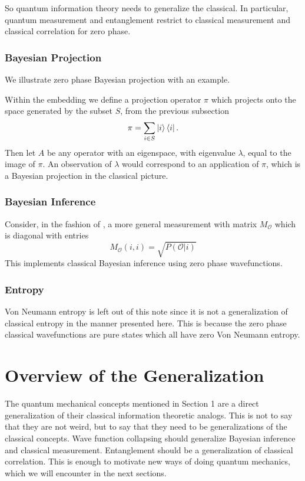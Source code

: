 \documentclass[12pt,a4paper]{article}
\begin{document}
So quantum information theory needs to generalize the classical.  In particular, quantum measurement and entanglement restrict to classical measurement and classical correlation for zero phase.

\subsubsection{Bayesian Projection}
We illustrate zero phase Bayesian projection with an example.

Within the embedding we define a projection operator $\pi$ which projects onto the space generated by the subset $S$, from the previous subsection
\[
\pi = \sum_{i \in S} \ket{i} \bra{i}.
\]
Then let $A$ be any operator with an eigenspace, with eigenvalue $\lambda$, equal to the image of $\pi$.  An observation of $\lambda$ would correspond to an application of $\pi$, which is a Bayesian projection in the classical picture.

\subsubsection{Bayesian Inference}
Consider, in the fashion of \cite{nielsenchuang}, a more general measurement with matrix $M_\mathcal{O}$ which is diagonal with entries
\[
   M_\mathcal{O}(i,i) = \sqrt{P(\mathcal{O} | i)}
\]
This implements classical Bayesian inference using zero phase wavefunctions.


\subsubsection{Entropy}
Von Neumann entropy is left out of this note since it is not a generalization of classical entropy in the manner presented here.  This is because the zero phase classical wavefunctions are pure states which all have zero Von Neumann entropy.

\section{Overview of the Generalization}

The quantum mechanical concepts mentioned in Section 1 are a direct generalization of their classical information theoretic analogs.  This is not to say that they are not weird, but to say that they need to be generalizations of the classical concepts.  Wave function collapsing should generalize Bayesian inference and classical measurement.  Entanglement should be a generalization of classical correlation.  This is enough to motivate new ways of doing quantum mechanics, which we will encounter in the next sections.
\end{document}
